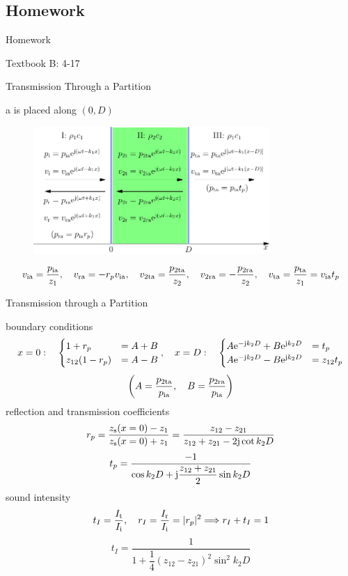 \documentclass[9pt,mathserif]{beamer}
\let\emph\relax %
\begin{document}
\subsection{Homework}
\begin{frame}{Homework}
	\begin{outline}[enumerate]
		\1 Textbook B: 4-17
	\end{outline}
\end{frame}


\begin{frame}{Transmission Through a Partition}
	\begin{outline}
		\1 a \emph{partition} is placed along $(0,D)$
	\end{outline}
	\begin{figure}
		\centering
		\includegraphics[width=0.8\textwidth]{img/idealfluid/planeVertIncPartition.pdf}
	\end{figure}
	$$
	v\st{ia} = \frac{p\st{ia}}{z_1}\qc
	v\st{ra}=-r_pv\st{ia}\qc
	v\st{2ta} = \frac{p\st{2ta}}{z_2}\qc
	v\st{2ra} = -\frac{p\st{2ra}}{z_2}\qc
	v\st{ta} = \frac{p\st{ta}}{z_1} 
	=v\st{ia}t_p$$
\end{frame}

\begin{frame}{Transmission through a Partition}
	\begin{outline}
		\1 boundary conditions
		$$x = 0: \quad 
		\begin{cases}
			1+r_p &= A+B\\
			z_{12}(1-r_p) &= A-B	
		\end{cases}
		\qc
		x= D:\quad 
		\begin{cases}
			A\me^{-\mj k_2 D} +B\me^{\mj k_2D}&=t_p\\
			A\me^{-\mj k_2 D} -B\me^{\mj k_2D}&=z_{12}t_p
		\end{cases}
		$$
		$$\qty(
		A = \frac{p\st{2ta}}{p\st{ia}}
		\qc 
		B = \frac{p\st{2ra}}{p\st{ia}}
		)
		$$
		\1 reflection and transmission coefficients
		$$ r_p = \frac{z_\text{s}(x=0) - z_1}{z_\text{s}(x=0)+z_1}
		= \frac{z_{12}-z_{21}}{z_{12}+z_{21} -2\mathrm{j} \cot k_2 D}$$
		$$ t_p = \frac{-1}{\cos k_2 D + \mathrm{j} \dfrac{z_{12}+z_{21}}{2}
	\sin k_2 D}$$
		\1 sound intensity
		$$t_I = \frac{I\st{t}}{I\st{i}}\qc r_I = \frac{I\st{r}}{I\st{i}}
		 = |r_p|^2\imp r_I+t_I = 1 $$
		$$t_I = \frac{1}{1+\dfrac{1}{4} (z_{12}-z_{21})^2 \sin^2 k_2 D}$$
	\end{outline}
\end{frame}
\end{document}
